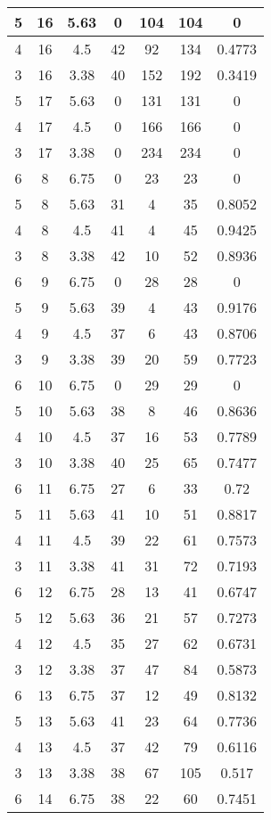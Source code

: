 \documentclass[letterpaper, 12pt]{article}
\begin{document}
\begin{longtable}{|c|c|c|c|c|c|c|}
\hline
5 & 16 & 5.63 & 0 & 104 & 104 & 0 \\
\hline
4 & 16 & 4.5 & 42 & 92 & 134 & 0.4773 \\
\hline
3 & 16 & 3.38 & 40 & 152 & 192 & 0.3419 \\
\hline
5 & 17 & 5.63 & 0 & 131 & 131 & 0 \\
\hline
4 & 17 & 4.5 & 0 & 166 & 166 & 0 \\
\hline
3 & 17 & 3.38 & 0 & 234 & 234 & 0 \\
\hline
6 & 8 & 6.75 & 0 & 23 & 23 & 0 \\
\hline
5 & 8 & 5.63 & 31 & 4 & 35 & 0.8052 \\
\hline
4 & 8 & 4.5 & 41 & 4 & 45 & 0.9425 \\
\hline
3 & 8 & 3.38 & 42 & 10 & 52 & 0.8936 \\
\hline
6 & 9 & 6.75 & 0 & 28 & 28 & 0 \\
\hline
5 & 9 & 5.63 & 39 & 4 & 43 & 0.9176 \\
\hline
4 & 9 & 4.5 & 37 & 6 & 43 & 0.8706 \\
\hline
3 & 9 & 3.38 & 39 & 20 & 59 & 0.7723 \\
\hline
6 & 10 & 6.75 & 0 & 29 & 29 & 0 \\
\hline
5 & 10 & 5.63 & 38 & 8 & 46 & 0.8636 \\
\hline
4 & 10 & 4.5 & 37 & 16 & 53 & 0.7789 \\
\hline
3 & 10 & 3.38 & 40 & 25 & 65 & 0.7477 \\
\hline
6 & 11 & 6.75 & 27 & 6 & 33 & 0.72 \\
\hline
5 & 11 & 5.63 & 41 & 10 & 51 & 0.8817 \\
\hline
4 & 11 & 4.5 & 39 & 22 & 61 & 0.7573 \\
\hline
3 & 11 & 3.38 & 41 & 31 & 72 & 0.7193 \\
\hline
6 & 12 & 6.75 & 28 & 13 & 41 & 0.6747 \\
\hline
5 & 12 & 5.63 & 36 & 21 & 57 & 0.7273 \\
\hline
4 & 12 & 4.5 & 35 & 27 & 62 & 0.6731 \\
\hline
3 & 12 & 3.38 & 37 & 47 & 84 & 0.5873 \\
\hline
6 & 13 & 6.75 & 37 & 12 & 49 & 0.8132 \\
\hline
5 & 13 & 5.63 & 41 & 23 & 64 & 0.7736 \\
\hline
4 & 13 & 4.5 & 37 & 42 & 79 & 0.6116 \\
\hline
3 & 13 & 3.38 & 38 & 67 & 105 & 0.517 \\
\hline
6 & 14 & 6.75 & 38 & 22 & 60 & 0.7451 \\

\end{longtable}
\end{document}
